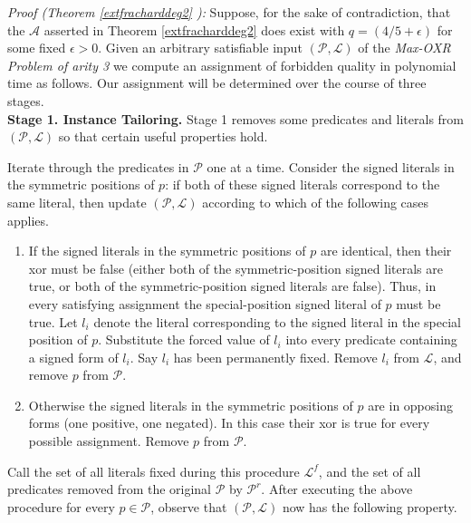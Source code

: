 \documentclass{article}
\begin{document}
\noindent \textit{Proof (Theorem \ref{extfracharddeg2} ):}  Suppose, for the sake of contradiction, that the $\mathcal{A}$ asserted in Theorem \ref{extfracharddeg2} does exist with $q=(4/5+\epsilon)$ for some fixed $\epsilon>0$. Given an arbitrary satisfiable input $(\mathcal{P}, \mathcal{L})$ of the \textit{Max-OXR Problem of arity 3} we compute an assignment of forbidden quality in polynomial time as follows. Our assignment will be determined over the course of three stages. \\

\noindent \textbf{Stage 1. Instance Tailoring.} Stage 1 removes some predicates and literals from $(\mathcal{P}, \mathcal{L})$ so that certain useful properties hold. 

Iterate through the predicates in $\mathcal{P}$ one at a time.  Consider the signed literals in the symmetric positions of $p$: if both of these signed literals correspond to the same literal, then update $(\mathcal{P}, \mathcal{L})$ according to which of the following cases applies.

\begin{enumerate}
\item If the signed literals in the symmetric positions of $p$ are identical, then their xor must be false (either both of the symmetric-position signed literals are true, or both of the symmetric-position signed literals are false). Thus, in every satisfying assignment the special-position signed literal of $p$ must be true. 
Let $l_i$ denote the literal corresponding to the signed literal in the special position of $p$. Substitute the forced value of $l_i$ into every predicate containing a signed form of $l_i$. Say $l_i$ has been permanently fixed. Remove $l_i$ from $\mathcal{L}$, and remove $p$ from $\mathcal{P}$. 

\item Otherwise the signed literals in the symmetric positions of $p$ are in opposing forms (one positive, one negated). In this case their xor is true for every possible assignment. Remove $p$ from $\mathcal{P}$.
\end{enumerate}
    
   Call the set of all literals fixed during this procedure $\mathcal{L}^f$, and the set of all predicates removed from the original $\mathcal{P}$ by $\mathcal{P}^r$.
After executing the above procedure for every $p\in \mathcal{P}$, observe that $(\mathcal{P}, \mathcal{L})$ now has the following property.  \\
\end{document}
